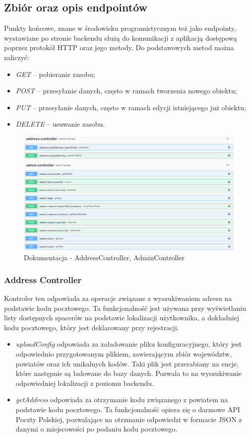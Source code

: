 \subsection{Zbiór oraz opis endpointów}
Punkty końcowe, znane w środowisku programistycznym też jako endpointy, wystawiane po stronie backendu służą do komunikacji z aplikacją dostępową poprzez protokół HTTP oraz jego metody. 
Do podstawowych metod można zaliczyć: 
\begin{itemize}[leftmargin=1cm]
  \item \textit{GET} -- pobieranie zasobu;
  \item \textit{POST} -- przesyłanie danych, często w ramach tworzenia nowego obiektu;
  \item \textit{PUT} -- przesyłanie danych, często w ramach edycji istniejącego już obiektu;
  \item \textit{DELETE} -- usuwanie zasobu.
\end{itemize}

\begin{figure}[H]
    \centering
    \includegraphics[width=1\linewidth]{rysunki/sw-1.PNG}
    \caption{Dokumentacja - AddressController, AdminController}
    \label{fig:swagger-1}
\end{figure}

\subsubsection{Address Controller}
Kontroler ten odpowiada za operacje związane z wyszukiwaniem adresu na podstawie kodu pocztowego. Ta funkcjonalność jest używana przy wyświetlaniu listy dostępnych spacerów na podstawie lokalizacji użytkownika, a dokładniej kodu pocztowego, który jest deklarowany przy rejestracji.
\begin{itemize}[leftmargin=1cm]
  \item \textit{uploadConfig} odpowiada za załadowanie pliku konfiguracyjnego, który jest odpowiednio przygotowanym plikiem, zawierającym zbiór województw, powiatów oraz ich unikalnych kodów. Taki plik jest przerabiany na encje, które następnie są ładowane do bazy danych. Pozwala to na wyszukiwanie odpowiedniej lokalizacji z poziomu backendu.
  \item \textit{getAddress} odpowiada za otrzymanie kodu związanego z powiatem na podstawie kodu pocztowego. Ta funkcjonalność opiera się o darmowe API Poczty Polskiej, pozwalające na otrzmanie odpowiedzi w formacie JSON z danymi o miejscowości po podaniu kodu pocztowego. 
\end{itemize}

